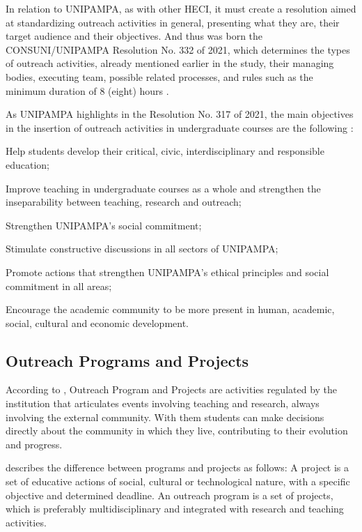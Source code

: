 In relation to \ac{UNIPAMPA}, as with other \ac{HECI}, it must create a resolution aimed at standardizing outreach activities in general, presenting what they are, their target audience and their objectives. And thus was born the CONSUNI/UNIPAMPA Resolution No. 332 of 2021, which determines the types of outreach activities, already mentioned earlier in the study, their managing bodies, executing team, possible related processes, and rules such as the minimum duration of 8 (eight) hours \cite{Resolucao-332:2021}.

As \ac{UNIPAMPA} highlights in the Resolution No. 317 of 2021, the main objectives in the insertion of outreach activities in undergraduate courses are the following \cite{res317}:
\begin{inparaenum}[(i)]
  \item Help students develop their critical, civic, interdisciplinary and responsible education;
  \item Improve teaching in undergraduate courses as a whole and strengthen the inseparability between teaching, research and outreach;
  \item Strengthen \ac{UNIPAMPA}'s social commitment;
  \item Stimulate constructive discussions in all sectors of \ac{UNIPAMPA};
  \item Promote actions that strengthen \ac{UNIPAMPA}'s ethical principles and social commitment in all areas;
  \item Encourage the academic community to be more present in human, academic, social, cultural and economic development.
\end{inparaenum}

\subsection{Outreach Programs and Projects}\label{sec:bac-programs-projects}

According to \textcite{referenciaisPolitica}, Outreach Program and Projects are activities regulated by the institution that articulates events involving teaching and research, always involving the external community. With them students can make decisions directly about the community in which they live, contributing to their evolution and progress.

\textcite{Viero} describes the difference between programs and projects as follows: A project is a set of educative actions of social, cultural or technological nature, with a specific objective and determined deadline. An outreach program is a set of projects, which is preferably multidisciplinary and integrated with research and teaching activities.

